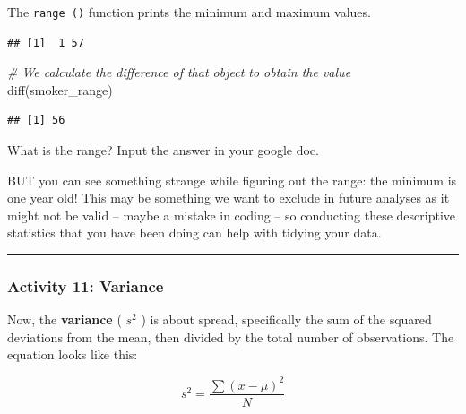 \documentclass[
]{book}
\newenvironment{Shaded}{\begin{snugshade}}{\end{snugshade}}
\newcommand{\AttributeTok}[1]{\textcolor[rgb]{0.77,0.63,0.00}{#1}}
\newcommand{\CommentTok}[1]{\textcolor[rgb]{0.56,0.35,0.01}{\textit{#1}}}
\newcommand{\ConstantTok}[1]{\textcolor[rgb]{0.00,0.00,0.00}{#1}}
\newcommand{\FunctionTok}[1]{\textcolor[rgb]{0.00,0.00,0.00}{#1}}
\newcommand{\NormalTok}[1]{#1}
\newcommand{\OtherTok}[1]{\textcolor[rgb]{0.56,0.35,0.01}{#1}}
\newcommand{\SpecialCharTok}[1]{\textcolor[rgb]{0.00,0.00,0.00}{#1}}
\begin{document}
The \texttt{range\ ()} function prints the minimum and maximum values.

\begin{Shaded}
\end{Shaded}

\begin{verbatim}
## [1]  1 57
\end{verbatim}

\begin{Shaded}
\begin{Highlighting}[]
\CommentTok{\# We calculate the difference of that object to obtain the value}
\FunctionTok{diff}\NormalTok{(smoker\_range)}
\end{Highlighting}
\end{Shaded}

\begin{verbatim}
## [1] 56
\end{verbatim}

What is the range? Input the answer in your google doc.

BUT you can see something strange while figuring out the range: the minimum is one year old! This may be something we want to exclude in future analyses as it might not be valid -- maybe a mistake in coding -- so conducting these descriptive statistics that you have been doing can help with tidying your data.

\begin{center}\rule{0.5\linewidth}{0.5pt}\end{center}

\hypertarget{activity-11-variance}{%
\subsubsection{Activity 11: Variance}\label{activity-11-variance}}

Now, the \textbf{variance} ( \(s^2\) ) is about spread, specifically the sum of the squared deviations from the mean, then divided by the total number of observations. The equation looks like this:

\[ s^2 = \frac{\sum(x - \mu)^2}{N}\]
\end{document}
